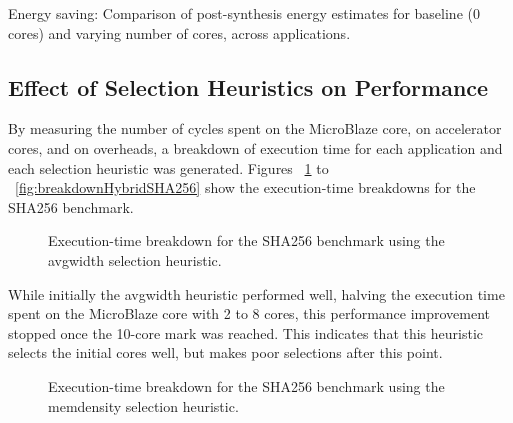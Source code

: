 \documentclass{UoYCSproject}
\begin{document}
Energy saving: Comparison of post-synthesis energy estimates for baseline (0 cores) and varying number of cores, across
applications.

\subsection{Effect of Selection Heuristics on Performance}

By measuring the number of cycles spent on the MicroBlaze core, on accelerator cores, and on overheads,
a breakdown of execution time for each application and each selection heuristic was generated.
Figures ~\ref{fig:breakdownAvgWidthSHA256} to ~\ref{fig:breakdownHybridSHA256} show the execution-time breakdowns
for the SHA256 benchmark.

\begin{figure}[H]
\caption{Execution-time breakdown for the SHA256 benchmark using the avgwidth selection heuristic.}
\label{fig:breakdownAvgWidthSHA256}
\end{figure}

While initially the avgwidth heuristic performed well, halving the execution time spent on the MicroBlaze core
with 2 to 8 cores, this performance improvement stopped once the 10-core mark was reached. This indicates
that this heuristic selects the initial cores well, but makes poor selections after this point.

\begin{figure}[H]
\caption{Execution-time breakdown for the SHA256 benchmark using the memdensity selection heuristic.}
\label{fig:breakdownMemDensitySHA256}
\end{figure}
\end{document}

